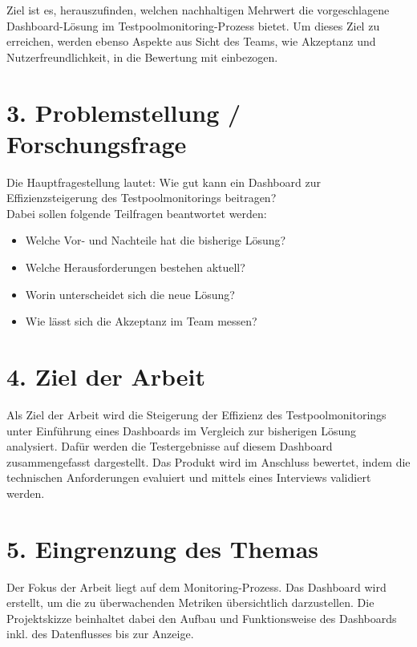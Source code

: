 Ziel ist es, herauszufinden, welchen nachhaltigen Mehrwert die vorgeschlagene Dashboard-Lösung im Testpoolmonitoring-Prozess bietet. Um dieses Ziel zu erreichen, werden ebenso Aspekte aus Sicht des Teams, wie Akzeptanz und Nutzerfreundlichkeit, in die Bewertung mit einbezogen.

\section*{3. Problemstellung / Forschungsfrage}
Die Hauptfragestellung lautet: Wie gut kann ein Dashboard zur Effizienzsteigerung des Testpoolmonitorings beitragen?\\
Dabei sollen folgende Teilfragen beantwortet werden:
\begin{itemize}
    \item Welche Vor- und Nachteile hat die bisherige Lösung?
    \item Welche Herausforderungen bestehen aktuell?
    \item Worin unterscheidet sich die neue Lösung?
    \item Wie lässt sich die Akzeptanz im Team messen?
\end{itemize}

\section*{4. Ziel der Arbeit}
Als Ziel der Arbeit wird die Steigerung der Effizienz des Testpoolmonitorings unter Einführung eines Dashboards im Vergleich zur bisherigen Lösung analysiert. Dafür werden die Testergebnisse auf diesem Dashboard zusammengefasst dargestellt. Das Produkt wird im Anschluss bewertet, indem die technischen Anforderungen evaluiert und mittels eines Interviews validiert werden.

\section*{5. Eingrenzung des Themas}
Der Fokus der Arbeit liegt auf dem Monitoring-Prozess. Das Dashboard wird erstellt, um die zu überwachenden Metriken übersichtlich darzustellen. Die Projektskizze beinhaltet dabei den Aufbau und Funktionsweise des Dashboards inkl. des Datenflusses bis zur Anzeige.

